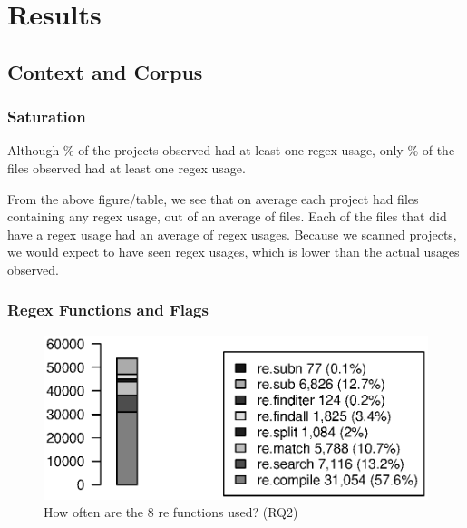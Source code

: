 \section{Results}

\subsection{Context and Corpus}

\subsubsection{Saturation}Although \% of the projects observed had at least one regex usage, only \% of the files observed had at least one regex usage.

%

From the above figure/table, we see that on average each project had  files containing any regex usage, out of an average of  files.  Each of the files that did have a regex usage had an average of  regex usages.  Because we scanned  projects, we would expect to have seen  regex usages, which is lower than the actual  usages observed.

\subsubsection{Regex Functions and Flags}

\begin{figure}[htb]
\centering
\includegraphics[width=\columnwidth]{../analysis_output/partFunctions.eps}
\caption{How often are the 8 re functions used? (RQ2)}
\label{fig:partFunctions}
\end{figure}

